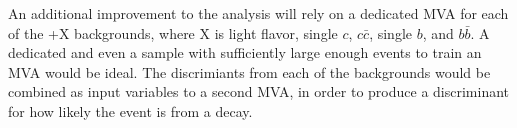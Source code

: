 \par  An additional improvement to the analysis will rely on a
dedicated MVA for each of the \ttbar+X backgrounds, where X is light
flavor, single $c$, $c\bar{c}$, single $b$, and $b\bar{b}$.  A
dedicated \ttbb and even a \ttcc sample with sufficiently large enough
events to train an MVA would be ideal.  The discrimiants from each of
the backgrounds would be combined as input variables to a second MVA,
in order to produce a discriminant for how likely the event is from a
\ttH decay.  

